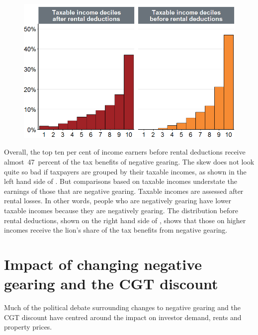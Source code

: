 \documentclass{grattan}\usepackage[]{graphicx}\usepackage[]{color}
\begin{document}
\begin{figure}
\includegraphics[width=\columnwidth]{CGT-NG-atlas//Benefit-NG-before-after-deductions-1}

\end{figure}

Overall, the top ten per cent of income earners before rental deductions receive almost~47~percent 
of the tax benefits of negative gearing. The skew does not look quite so bad if taxpayers are grouped by their taxable incomes, as shown in the left hand side of . But comparisons based on taxable incomes understate the earnings of those that are negative gearing. Taxable incomes are assessed after rental losses. In other words, people who are negatively gearing have lower taxable incomes because they are negatively gearing. The distribution before rental deductions, shown on the right hand side of , shows that those on higher incomes receive the lion's share of the tax benefits from negative gearing.


\chapter{Impact of changing negative gearing and the CGT discount}
Much of the political debate surrounding changes to negative gearing and the CGT discount have centred around the impact on investor demand, rents and property prices. 
\end{document}
